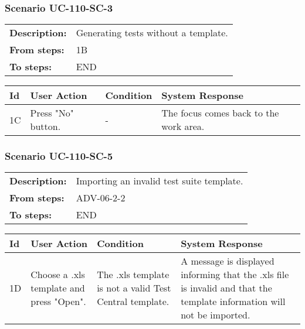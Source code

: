 \documentclass[a4paper,11pt]{article}
\newcommand{\bl}{\\ \hline}
\begin{document}
\subsubsection*{Scenario UC-110-SC-3}
\begin{tabular}{p{1in}p{4in}}
{\bf Description:} & Generating tests without a template. \\
{\bf From steps:} & 1B \\
{\bf To steps:} & END \\
\end{tabular}
 
\begin{tabular}{|p{0.8in}|p{1.6in}|p{1.6in}|p{1.6in}|}
\hline
Id & User Action & Condition & System Response  \bl 
1C & Press "No" button. & - & The focus comes back to the work area. \bl 
\end{tabular}
\subsubsection*{Scenario UC-110-SC-5}
\begin{tabular}{p{1in}p{4in}}
{\bf Description:} & Importing an invalid test suite template. \\
{\bf From steps:} & ADV-06-2-2 \\
{\bf To steps:} & END \\
\end{tabular}
 
\begin{tabular}{|p{0.8in}|p{1.6in}|p{1.6in}|p{1.6in}|}
\hline
Id & User Action & Condition & System Response  \bl 
1D & Choose a .xls template and press "Open". & The .xls template is not a valid Test Central template. & A message is displayed informing that the .xls file is invalid and that the template information will not be imported. \bl 
\end{tabular}
\end{document}
